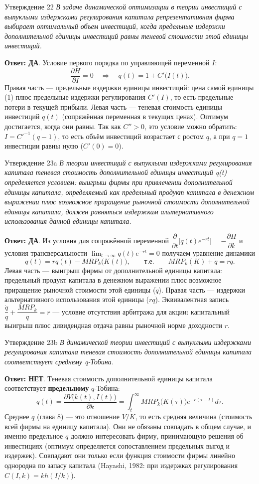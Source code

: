 \documentclass[10pt,a4paper]{article}
\newcommand{\qda}{\textbf{\color{yesgreen}Ответ: ДА}}
\newcommand{\qnet}{\textbf{\color{nored}Ответ: НЕТ}}
\newenvironment{answer}[2]{%
  \begin{qbox}{Утверждение #1}
  \textit{#2}\par\smallskip
}{%
  \end{qbox}\vspace{2pt}
}
\begin{document}
\begin{answer}{22}{В задаче динамической оптимизации в теории инвестиций с выпуклыми издержками регулирования капитала репрезентативная фирма выбирает оптимальный объем инвестиций, когда предельные издержки дополнительной единицы инвестиций равны теневой стоимости этой единицы инвестиций.}
\qda. Условие первого порядка по управляющей переменной $I$:
\[
\dfrac{\partial H}{\partial I}=0\quad\Longrightarrow\quad q(t)=1+C'\bigl(I(t)\bigr).
\]
Правая часть --- предельные издержки единицы инвестиций: цена самой единицы (1) плюс предельные издержки регулирования $C'(I)$, то есть предельные потери в текущей прибыли. Левая часть --- теневая стоимость единицы инвестиций $q(t)$ (сопряжённая переменная в текущих ценах). Оптимум достигается, когда они равны. Так как $C''>0$, это условие можно обратить: $I=C'^{-1}(q-1)$, то есть объём инвестиций возрастает с ростом $q$, а при $q=1$ инвестиции равны нулю ($C'(0)=0$).
\end{answer}

\begin{answer}{23a}{В теории инвестиций с выпуклыми издержками регулирования капитала теневая стоимость дополнительной единицы инвестиций q(t) определяется условием: выигрыш фирмы при привлечении дополнительной единицы капитала, определяемый как предельный продукт капитала в денежном выражении плюс возможное приращение рыночной стоимости дополнительной единицы капитала, должен равняться издержкам альтернативного использования данной единицы капитала.}
\qda. Из условия для сопряжённой переменной $\dfrac{\partial}{\partial t}\bigl[q(t)e^{-rt}\bigr]=-\dfrac{\partial H}{\partial k}$ и условия трансверсальности $\lim_{t\to\infty}q(t)e^{-rt}=0$ получаем уравнение динамики
\[
\dot q(t)=rq(t)-MRP_k\bigl(K(t)\bigr),\qquad\text{т.е.}\qquad MRP_k(K)+\dot q=rq.
\]
Левая часть --- выигрыш фирмы от дополнительной единицы капитала: предельный продукт капитала в денежном выражении плюс возможное приращение рыночной стоимости этой единицы ($\dot q$). Правая часть --- издержки альтернативного использования этой единицы ($rq$). Эквивалентная запись $\dfrac{\dot q}{q}+\dfrac{MRP_k}{q}=r$ --- условие отсутствия арбитража для акции: капитальный выигрыш плюс дивидендная отдача равны рыночной норме доходности $r$.
\end{answer}

\begin{answer}{23b}{В динамической теории инвестиций с выпуклыми издержками регулирования капитала теневая стоимость дополнительной единицы капитала соответствует среднему q-Тобина.}
\qnet. Теневая стоимость дополнительной единицы капитала соответствует \textbf{предельному} $q$-Тобина:
\[
q(t)=\dfrac{\partial V\bigl(k(t),I(t)\bigr)}{\partial k}=\int_t^\infty MRP_k\bigl(K(\tau)\bigr)e^{-r(\tau-t)}d\tau.
\]
Среднее $q$ (глава 8) --- это отношение $V/K$, то есть средняя величина (стоимость всей фирмы на единицу капитала). Они не обязаны совпадать в общем случае, и именно предельное $q$ должно интересовать фирму, принимающую решения об инвестициях (оптимум определяется сопоставлением предельных выгод и издержек). Совпадают они только если функция стоимости фирмы линейно однородна по запасу капитала (Hayashi, 1982: при издержках регулирования $C(I,k)=kh(I/k)$).
\end{answer}
\end{document}
